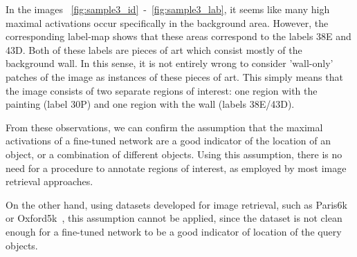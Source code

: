 In the images
~\ref{fig:sample3_id}~-~\ref{fig:sample3_lab}, it seems like many
high maximal activations occur specifically in the background area.
However, the corresponding label-map shows that these areas correspond
to the labels 38E and 43D. Both of these labels are pieces of art which
consist mostly of the background wall. In this sense, it is not
entirely wrong to consider 'wall-only' patches of the image as instances of
these pieces of art. This simply means that the image consists of two
separate regions of interest: one region with the painting (label 30P)
and one region with the wall (labels 38E/43D).

From these observations, we can confirm the assumption that the
maximal activations of a fine-tuned network are a good indicator of
the location of an object, or a combination of different objects.
Using this assumption, there is no need
for a procedure to annotate regions of interest, as employed by most
image retrieval approaches. %

On the other hand, using datasets developed for image retrieval,
such as Paris6k or Oxford5k~\cite{philbin_lost_2008,philbin_object_2007},
this assumption cannot be applied, since the dataset is not clean
enough for a fine-tuned network to be a good indicator of location of
the query objects.

